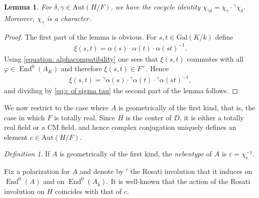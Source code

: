 \documentclass[oneside]{amsart}
\newtheorem{lemma}[theorem]{Lemma}
\theoremstyle{remark}
\newtheorem{definition}[theorem]{Definition}
\newcommand{\kbar}{{\bar{k}}}
\newcommand{\Gal}{\mathrm{Gal}}
\newcommand{\Aut}{\mathrm{Aut}}
\newcommand{\End}{\operatorname{End}}
\numberwithin{equation}{section}
\begin{document}
\begin{lemma}
For $\delta, \gamma\in \Aut(H/F)$, we have the cocycle identity $\chi_{\gamma\delta} = \chi_\gamma\cdot {}^{\gamma}\chi_\delta$. Moreover, $\chi_\gamma$ is a character.
\end{lemma}

\begin{proof}
The first part of the lemma is obvious. For $s,t \in \Gal(K/k)$ define
  \begin{align}\label{eq:c of sigma tau}
    \xi(s,t) = \alpha(s)\cdot \alpha(t)\cdot \alpha(st)^{-1}.
  \end{align}
Using \eqref{equation: alphacompatibility} one sees that $\xi(s,t)$ commutes with all $\varphi\in \End^0(A_K)$ and therefore  $\xi(s,t)\in F^\times$.  Hence
  \begin{align*}
    \xi(s,t) = {}^{\gamma}\alpha(s)\cdot {}^{\gamma}\alpha(t)\cdot {}^{\gamma}\alpha(st)^{-1},
  \end{align*}
  and dividing by \eqref{eq:c of sigma tau} the second part of the lemma follows. 
\end{proof}

We now restrict to the case where $A$ is geometrically of the first kind, that is, the case in which $F$ is totally real. Since $H$ is the center of $D$, it is either a totally real field or a CM field, and hence complex conjugation uniquely defines an element $c\in  \Aut(H/F)$.


\begin{definition}
If $A$ is geometrically of the first kind, the \emph{nebentype} of $A$ is $\varepsilon=\chi_c^{-1}$.
\end{definition}

Fix a polarization for $A$ and denote by $'$ the Rosati involution that it induces on $\End^0(A)$ and on $\End^0(A_\kbar)$.  It is well-known that the action of the Rosati involution on $H$ coincides with that of $c$. 
\end{document}
